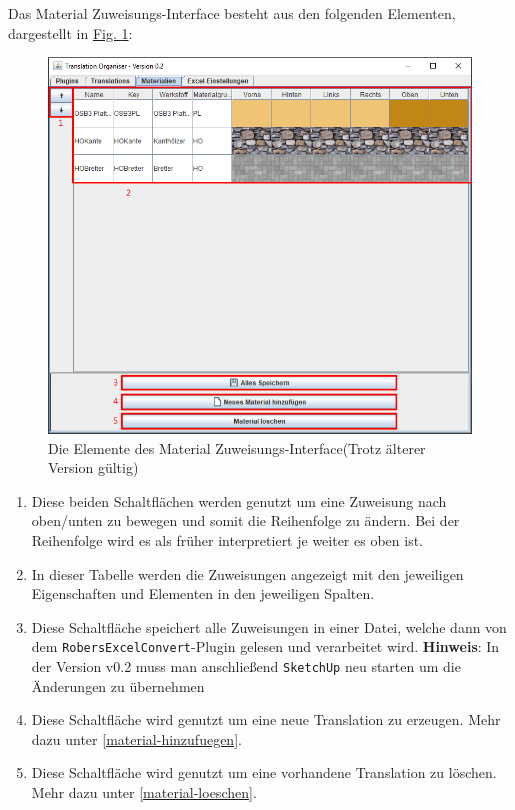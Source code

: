 \documentclass{book}
\newcommand{\sketchup}{\texttt{SketchUp}\xspace}
\newcommand{\robersexcelconvert}{\texttt{RobersExcelConvert}\xspace}
\newcommand{\hinweis}[1]{\newline \textbf{Hinweis}: #1 \newline}
\begin{document}
			Das Material Zuweisungs-Interface besteht aus den folgenden Elementen, dargestellt in \hyperref[fig:materials-normal]{Fig. \ref{fig:materials-normal}}:
			\begin{figure}
				\centering
				\includegraphics[scale=0.48]{pics/assisttool/materials-normal.png}
				\caption{Die Elemente des Material Zuweisungs-Interface\newline (Trotz älterer Version gültig)}
				\label{fig:materials-normal}
			\end{figure}
			
			\begin{enumerate}
				\item Diese beiden Schaltflächen werden genutzt um eine Zuweisung nach oben/unten zu bewegen und somit die Reihenfolge zu ändern. Bei der Reihenfolge wird es als früher interpretiert je weiter es oben ist.
				\item In dieser Tabelle werden die Zuweisungen angezeigt mit den jeweiligen Eigenschaften und Elementen in den jeweiligen Spalten.
				\item Diese Schaltfläche speichert alle Zuweisungen in einer Datei, welche dann von dem \robersexcelconvert-Plugin gelesen und verarbeitet wird.
				\hinweis{In der Version v0.2 muss man anschließend \sketchup neu starten um die Änderungen zu übernehmen}
				\item Diese Schaltfläche wird genutzt um eine neue Translation zu erzeugen. Mehr dazu unter \ref{material-hinzufuegen}.
				\item Diese Schaltfläche wird genutzt um eine vorhandene Translation zu löschen. Mehr dazu unter \hyperref[material-loeschen]{\ref{material-loeschen}}.
			\end{enumerate}
		
\end{document}
